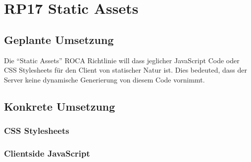 \section{RP17 Static Assets}
\label{sec:principle-rp17-static-assets}

\subsection*{Geplante Umsetzung}
Die ``Static Assets'' ROCA Richtlinie will dass jeglicher JavaScript Code oder CSS Stylesheets für den Client von statischer Natur ist. Dies bedeuted, dass der Server keine dynamische Generierung von diesem Code vornimmt.



\subsection*{Konkrete Umsetzung}
\subsubsection*{CSS Stylesheets}


\subsubsection*{Clientside JavaScript}

